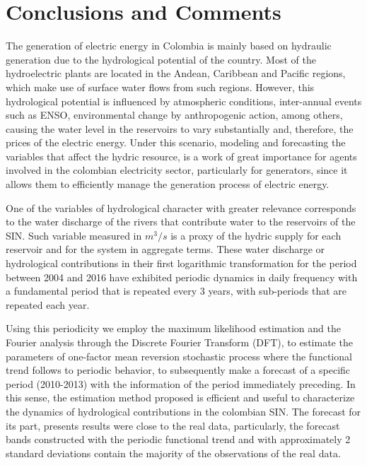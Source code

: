 \documentclass[12pt,halfline,a4paper]{ouparticle}
\begin{document}
\section{Conclusions and Comments}\label{conclusions}

The generation of electric energy in Colombia is mainly based on hydraulic generation due to the hydrological potential of the country. Most of the hydroelectric plants are located in the Andean, Caribbean and Pacific regions, which make use of surface water flows from such regions. However, this hydrological potential is influenced by atmospheric conditions, inter-annual events such as ENSO, environmental change by anthropogenic action, among others, causing the water level in the reservoirs to vary substantially and, therefore, the prices of the electric energy. Under this scenario, modeling and forecasting the variables that affect the hydric resource, is a work of great importance for agents involved in the colombian electricity sector, particularly for generators, since it allows them to efficiently manage the generation process of electric energy.

One of the variables of hydrological character with greater relevance corresponds to the water discharge of the rivers that contribute water to the reservoirs of the SIN. Such variable measured in $m^{3}/s$ is a proxy of the hydric supply for each reservoir and for the system in aggregate terms. These water discharge or hydrological contributions in their first logarithmic transformation for the period between 2004 and 2016 have exhibited periodic dynamics in daily frequency with a fundamental period that is repeated every 3 years, with sub-periods that are repeated each year.

Using this periodicity we employ the maximum likelihood estimation and the Fourier analysis through the Discrete Fourier Transform (DFT), to estimate the parameters of one-factor mean reversion stochastic process where the functional trend follows to periodic behavior, to subsequently make a forecast of a specific period (2010-2013) with the information of the period immediately preceding. In this sense, the estimation method proposed is efficient and useful to characterize the dynamics of hydrological contributions in the colombian SIN. The forecast for its part, presents results were close to the real data, particularly, the forecast bands constructed with the periodic functional trend and with approximately 2 standard deviations contain the majority of the observations of the real data.
\end{document}

